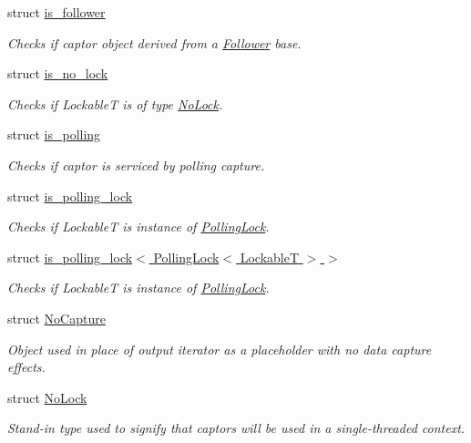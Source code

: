 \begin{DoxyCompactItemize}
struct \hyperlink{structflow_1_1is__follower}{is\+\_\+follower}
\begin{DoxyCompactList}\small\item\em Checks if captor object derived from a \hyperlink{classflow_1_1_follower}{Follower} base. \end{DoxyCompactList}\item 
struct \hyperlink{structflow_1_1is__no__lock}{is\+\_\+no\+\_\+lock}
\begin{DoxyCompactList}\small\item\em Checks if {\ttfamily LockableT} is of type \hyperlink{structflow_1_1_no_lock}{No\+Lock}. \end{DoxyCompactList}\item 
struct \hyperlink{structflow_1_1is__polling}{is\+\_\+polling}
\begin{DoxyCompactList}\small\item\em Checks if captor is serviced by polling capture. \end{DoxyCompactList}\item 
struct \hyperlink{structflow_1_1is__polling__lock}{is\+\_\+polling\+\_\+lock}
\begin{DoxyCompactList}\small\item\em Checks if {\ttfamily LockableT} is instance of \hyperlink{structflow_1_1_polling_lock}{Polling\+Lock}. \end{DoxyCompactList}\item 
struct \hyperlink{structflow_1_1is__polling__lock_3_01_polling_lock_3_01_lockable_t_01_4_01_4}{is\+\_\+polling\+\_\+lock$<$ Polling\+Lock$<$ Lockable\+T $>$ $>$}
\begin{DoxyCompactList}\small\item\em Checks if {\ttfamily LockableT} is instance of \hyperlink{structflow_1_1_polling_lock}{Polling\+Lock}. \end{DoxyCompactList}\item 
struct \hyperlink{structflow_1_1_no_capture}{No\+Capture}
\begin{DoxyCompactList}\small\item\em Object used in place of output iterator as a placeholder with no data capture effects. \end{DoxyCompactList}\item 
struct \hyperlink{structflow_1_1_no_lock}{No\+Lock}
\begin{DoxyCompactList}\small\item\em Stand-\/in type used to signify that captors will be used in a single-\/threaded context. \end{DoxyCompactList}\item 

\end{DoxyCompactItemize}
